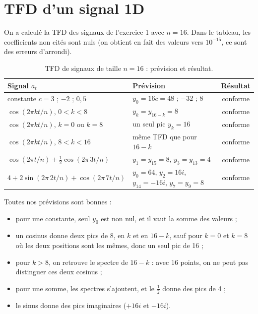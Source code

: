 \documentclass[11pt,a4paper]{article}
\begin{document}
\section{TFD d'un signal 1D}

On a calculé la TFD des signaux de l'exercice 1 avec $n = 16$. Dans le tableau, les
coefficients non cités sont nuls (on obtient en fait des valeurs vers $10^{-15}$, ce
sont des erreurs d'arrondi).

\begin{table}[H]
\centering
\caption{TFD de signaux de taille $n = 16$ : prévision et résultat.}
\label{tab:1d}
\begin{tabular}{|l|l|c|}
\hline
\textbf{Signal $a_t$} & \textbf{Prévision} & \textbf{Résultat} \\
\hline
constante $c = 3$ ; $-2$ ; $0{,}5$ & $y_0 = 16c = 48$ ; $-32$ ; $8$ & conforme \\
\hline
$\cos(2\pi k t/n)$, $0 < k < 8$ & $y_k = y_{16-k} = 8$ & conforme \\
\hline
$\cos(2\pi k t/n)$, $k = 0$ ou $k = 8$ & un seul pic $y_k = 16$ & conforme \\
\hline
$\cos(2\pi k t/n)$, $8 < k < 16$ & même TFD que pour $16-k$ & conforme \\
\hline
$\cos(2\pi t/n) + \frac12 \cos(2\pi\, 3t/n)$ & $y_1 = y_{15} = 8$, $y_3 = y_{13} = 4$ & conforme \\
\hline
$4 + 2\sin(2\pi\, 2t/n) + \cos(2\pi\, 7t/n)$ &
  $y_0 = 64$, $y_2 = 16i$, $y_{14} = -16i$, $y_7 = y_9 = 8$ & conforme \\
\hline
\end{tabular}
\end{table}

Toutes nos prévisions sont bonnes :
\begin{itemize}
  \item pour une constante, seul $y_0$ est non nul, et il vaut la somme des valeurs ;
  \item un cosinus donne deux pics de 8, en $k$ et en $16-k$, sauf pour $k = 0$ et
        $k = 8$ où les deux positions sont les mêmes, donc un seul pic de 16 ;
  \item pour $k > 8$, on retrouve le spectre de $16-k$ : avec 16 points, on ne peut
        pas distinguer ces deux cosinus ;
  \item pour une somme, les spectres s'ajoutent, et le $\frac12$ donne des pics de 4 ;
  \item le sinus donne des pics imaginaires ($+16i$ et $-16i$).
\end{itemize}
\end{document}
